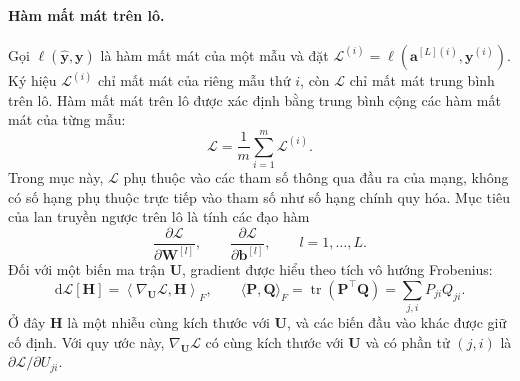 \paragraph{Hàm mất mát trên lô.\\} 
Gọi $\ell(\widehat{\mathbf{y}},\mathbf{y})$ là hàm mất mát của một mẫu và đặt $\mathcal{L}^{(i)} = \ell\!\left(\mathbf{a}^{[L](i)}, \mathbf{y}^{(i)}\right)$. Ký hiệu $\mathcal{L}^{(i)}$ chỉ mất mát của riêng mẫu thứ $i$, còn $\mathcal{L}$ chỉ mất mát trung bình trên lô. Hàm mất mát trên lô được xác định bằng trung bình cộng các hàm mất mát của từng mẫu:
\begin{equation}
\mathcal{L} = \frac{1}{m}\sum_{i=1}^{m}\mathcal{L}^{(i)}.
\label{eq:bpb_loss}
\end{equation}
Trong mục này, $\mathcal{L}$ phụ thuộc vào các tham số thông qua đầu ra của mạng, không có số hạng phụ thuộc trực tiếp vào tham số như số hạng chính quy hóa. Mục tiêu của lan truyền ngược trên lô là tính các đạo hàm
\begin{equation}
\frac{\partial\mathcal{L}}{\partial\mathbf{W}^{[l]}}, \qquad \frac{\partial\mathcal{L}}{\partial\mathbf{b}^{[l]}}, \qquad l=1,\dots,L.
\label{eq:bpb_goal}
\end{equation}
Đối với một biến ma trận $\mathbf{U}$, gradient được hiểu theo tích vô hướng Frobenius:
\begin{equation}
\mathrm{d}\mathcal{L}[\mathbf{H}]
= \left\langle\nabla_{\mathbf{U}}\mathcal{L},\mathbf{H}\right\rangle_F,
\qquad
\langle\mathbf{P},\mathbf{Q}\rangle_F
= \operatorname{tr}(\mathbf{P}^{\top}\mathbf{Q})
= \sum_{j,i} P_{ji}Q_{ji}.
\label{eq:bpb_frobenius_convention}
\end{equation}
Ở đây $\mathbf{H}$ là một nhiễu cùng kích thước với $\mathbf{U}$, và các biến đầu vào khác được giữ cố định. Với quy ước này, $\nabla_{\mathbf{U}}\mathcal{L}$ có cùng kích thước với $\mathbf{U}$ và có phần tử $(j,i)$ là $\partial\mathcal{L}/\partial U_{ji}$.
 
